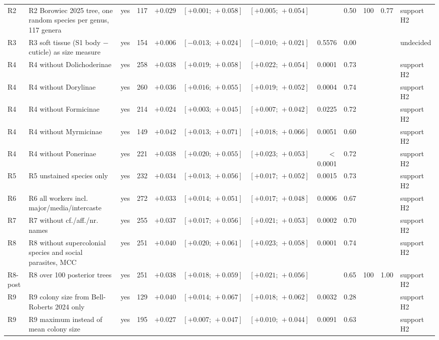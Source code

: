\begin{table}
\begin{tabular}{@{}l>{\raggedright\arraybackslash}p{9.0cm}>{\raggedright\arraybackslash}p{1.9cm}rrccrrrrl@{}}
R2 & R2 Borowiec 2025 tree, one random species per genus, 117 genera & yes & 117 & $+0.029$ & $[+0.001;\,+0.058]$ & $[+0.005;\,+0.054]$ &  & 0.50 & 100 & 0.77 & support H2 \\
R3 & R3 soft tissue (S1 body $-$ cuticle) as size measure & yes & 154 & $+0.006$ & $[-0.013;\,+0.024]$ & $[-0.010;\,+0.021]$ & 0.5576 & 0.00 &  &  & undecided \\
R4 & R4 without Dolichoderinae & yes & 258 & $+0.038$ & $[+0.019;\,+0.058]$ & $[+0.022;\,+0.054]$ & 0.0001 & 0.73 &  &  & support H2 \\
R4 & R4 without Dorylinae & yes & 260 & $+0.036$ & $[+0.016;\,+0.055]$ & $[+0.019;\,+0.052]$ & 0.0004 & 0.74 &  &  & support H2 \\
R4 & R4 without Formicinae & yes & 214 & $+0.024$ & $[+0.003;\,+0.045]$ & $[+0.007;\,+0.042]$ & 0.0225 & 0.72 &  &  & support H2 \\
R4 & R4 without Myrmicinae & yes & 149 & $+0.042$ & $[+0.013;\,+0.071]$ & $[+0.018;\,+0.066]$ & 0.0051 & 0.60 &  &  & support H2 \\
R4 & R4 without Ponerinae & yes & 221 & $+0.038$ & $[+0.020;\,+0.055]$ & $[+0.023;\,+0.053]$ & $<$0.0001 & 0.72 &  &  & support H2 \\
R5 & R5 unstained species only & yes & 232 & $+0.034$ & $[+0.013;\,+0.056]$ & $[+0.017;\,+0.052]$ & 0.0015 & 0.73 &  &  & support H2 \\
R6 & R6 all workers incl. major/media/intercaste & yes & 272 & $+0.033$ & $[+0.014;\,+0.051]$ & $[+0.017;\,+0.048]$ & 0.0006 & 0.67 &  &  & support H2 \\
R7 & R7 without cf./aff./nr. names & yes & 255 & $+0.037$ & $[+0.017;\,+0.056]$ & $[+0.021;\,+0.053]$ & 0.0002 & 0.70 &  &  & support H2 \\
R8 & R8 without supercolonial species and social parasites, MCC & yes & 251 & $+0.040$ & $[+0.020;\,+0.061]$ & $[+0.023;\,+0.058]$ & 0.0001 & 0.74 &  &  & support H2 \\
R8-post & R8 over 100 posterior trees & yes & 251 & $+0.038$ & $[+0.018;\,+0.059]$ & $[+0.021;\,+0.056]$ &  & 0.65 & 100 & 1.00 & support H2 \\
R9 & R9 colony size from Bell-Roberts 2024 only & yes & 129 & $+0.040$ & $[+0.014;\,+0.067]$ & $[+0.018;\,+0.062]$ & 0.0032 & 0.28 &  &  & support H2 \\
R9 & R9 maximum instead of mean colony size & yes & 195 & $+0.027$ & $[+0.007;\,+0.047]$ & $[+0.010;\,+0.044]$ & 0.0091 & 0.63 &  &  & support H2 \\

\end{tabular}
\end{table}
